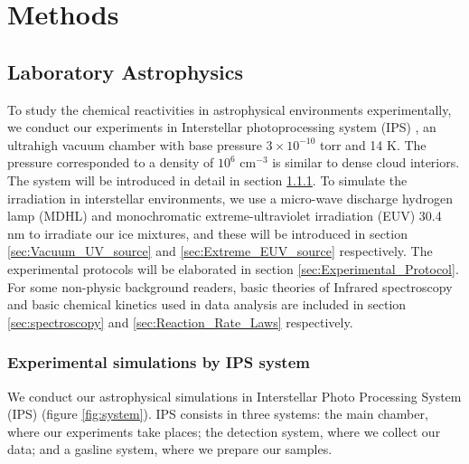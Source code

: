 \chapter{\protect Methods}
\label{methods}

\section{Laboratory Astrophysics}
To study the chemical reactivities in astrophysical environments experimentally,
we conduct our experiments in Interstellar photoprocessing system (IPS) \cite{chen2013vacuum},
an ultrahigh vacuum chamber with base pressure $3 \times 10^{-10}$ torr and 14 K. The pressure corresponded to a density of $10^6$ cm$^{-3}$ is similar to dense cloud interiors.
The system will be introduced in detail in section \ref{sec:IPS_system}.
To simulate the irradiation in interstellar environments,
we use a micro-wave discharge hydrogen lamp (MDHL) and monochromatic extreme-ultraviolet irradiation (EUV) 30.4 nm to irradiate our ice mixtures,
and these will be introduced in section \ref{sec:Vacuum_UV_source} and \ref{sec:Extreme_EUV_source} respectively.
The experimental protocols will be elaborated in section \ref{sec:Experimental_Protocol}.
For some non-physic background readers, basic theories of Infrared spectroscopy and basic chemical kinetics used in data analysis are included in section \ref{sec:spectroscopy} and \ref{sec:Reaction_Rate_Laws} respectively.\\

\subsection{Experimental simulations by IPS system}
\label{sec:IPS_system}

We conduct our astrophysical simulations in Interstellar Photo Processing System (IPS) (figure \ref{fig:system}). IPS consists in three systems: the main chamber, where our experiments take places; the detection system, where we collect our data; and a gasline system, where we prepare our samples.

